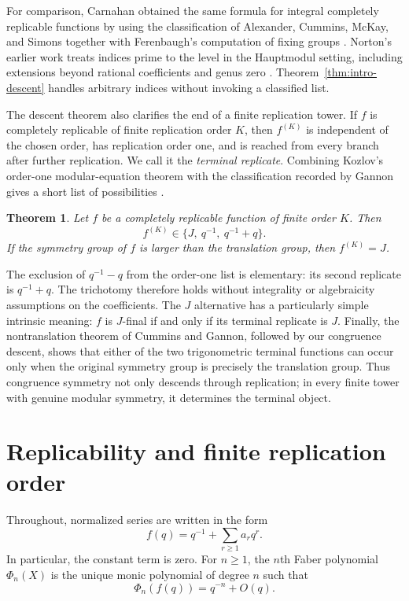 \documentclass[12pt]{amsart}
\newtheorem{thm}{Theorem}[section]
\theoremstyle{definition}
\theoremstyle{remark}
\numberwithin{equation}{section}
\begin{document}
For comparison, Carnahan obtained the same formula for integral completely
replicable functions by using the classification of Alexander, Cummins, McKay,
and Simons together with Ferenbaugh's computation of fixing groups
\cite{alexander-cummins-mckay-simons,ferenbaugh,carnahan}.  Norton's earlier
work treats indices prime to the level in the Hauptmodul setting, including
extensions beyond rational coefficients and genus zero
\cite{norton-nonmonstrous,cummins-norton}.  Theorem~\ref{thm:intro-descent}
handles arbitrary indices without invoking a classified list.

The descent theorem also clarifies the end of a finite replication tower.  If
$f$ is completely replicable of finite replication order $K$, then $f^{(K)}$
is independent of the chosen order, has replication order one, and is reached
from every branch after further replication.  We call it the \emph{terminal
replicate}.  Combining Kozlov's order-one modular-equation theorem with the
classification recorded by Gannon gives a short list of possibilities
\cite{kozlov,gannon-hauptmodul}.

\begin{thm}\label{thm:intro-terminal}
Let $f$ be a completely replicable function of finite order $K$. Then
\[
f^{(K)}\in\{J,\ q^{-1},\ q^{-1}+q\}.
\]
If the symmetry group of $f$ is larger than the translation group, then $f^{(K)}=J$.
\end{thm}

The exclusion of $q^{-1}-q$ from the order-one list is elementary: its second
replicate is $q^{-1}+q$.  The trichotomy therefore holds without integrality or
algebraicity assumptions on the coefficients.  The $J$ alternative has a
particularly simple intrinsic meaning: $f$ is $J$-final if and only if its
terminal replicate is $J$.  Finally, the nontranslation theorem of Cummins and
Gannon, followed by our congruence descent, shows that either of the two
trigonometric terminal functions can occur only when the original symmetry
group is precisely the translation group.  Thus congruence symmetry not only
descends through replication; in every finite tower with genuine modular
symmetry, it determines the terminal object.

\section{Replicability and finite replication order}

Throughout, normalized series are written in the form
\begin{equation}\label{eq:normalized-series}
f(q)=q^{-1}+\sum_{r\geq1}a_rq^r.
\end{equation}
In particular, the constant term is zero. For $n\geq1$, the $n$th Faber polynomial $\Phi_n(X)$ is the unique monic polynomial of degree $n$ such that
\begin{equation}\label{eq:Faber-normalization}
\Phi_n(f(q))=q^{-n}+O(q).
\end{equation}
\end{document}
